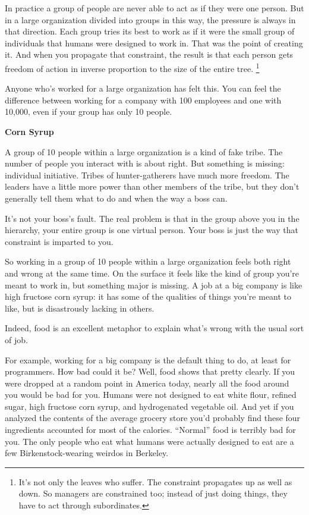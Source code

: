 \documentclass[12pt]{book}
\begin{document}
In practice a group of people are never able to act as if they were one
person. But in a large organization divided into groups in this way, the
pressure is always in that direction. Each group tries its best to work
as if it were the small group of individuals that humans were designed
to work in. That was the point of creating it. And when you propagate
that constraint, the result is that each person gets freedom of action
in inverse proportion to the size of the entire tree.
\footnote{It's not only the leaves who suffer. The constraint propagates
up as well as down. So managers are constrained too; instead of just
doing things, they have to act through subordinates.}

Anyone who's worked for a large organization has felt this. You can feel
the difference between working for a company with 100 employees and one
with 10,000, even if your group has only 10 people.

\textbf{Corn Syrup}

A group of 10 people within a large organization is a kind of fake
tribe. The number of people you interact with is about right. But
something is missing: individual initiative. Tribes of hunter-gatherers
have much more freedom. The leaders have a little more power than other
members of the tribe, but they don't generally tell them what to do and
when the way a boss can.

It's not your boss's fault. The real problem is that in the group above
you in the hierarchy, your entire group is one virtual person. Your boss
is just the way that constraint is imparted to you.

So working in a group of 10 people within a large organization feels
both right and wrong at the same time. On the surface it feels like the
kind of group you're meant to work in, but something major is missing. A
job at a big company is like high fructose corn syrup: it has some of
the qualities of things you're meant to like, but is disastrously
lacking in others.

Indeed, food is an excellent metaphor to explain what's wrong with the
usual sort of job.

For example, working for a big company is the default thing to do, at
least for programmers. How bad could it be? Well, food shows that pretty
clearly. If you were dropped at a random point in America today, nearly
all the food around you would be bad for you. Humans were not designed
to eat white flour, refined sugar, high fructose corn syrup, and
hydrogenated vegetable oil. And yet if you analyzed the contents of the
average grocery store you'd probably find these four ingredients
accounted for most of the calories. ``Normal'' food is terribly bad for
you. The only people who eat what humans were actually designed to eat
are a few Birkenstock-wearing weirdos in Berkeley.
\end{document}
